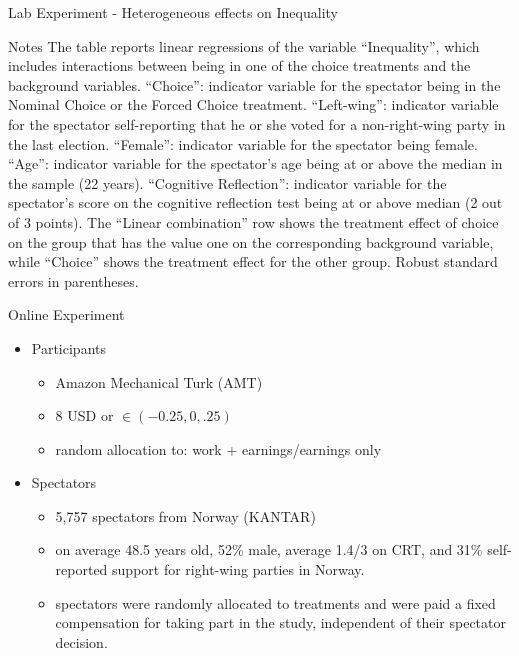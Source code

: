 \documentclass{beamer}
\begin{document}
	\begin{frame}{\tiny Lab Experiment - Heterogeneous effects on Inequality}

	\begin{block}{Notes}{\tiny
		The table reports linear regressions of the variable “Inequality”, which includes interactions
between being in one of the choice treatments and the background variables. “Choice”: indicator
variable for the spectator being in the Nominal Choice or the Forced Choice treatment. “Left-wing”:
indicator variable for the spectator self-reporting that he or she voted for a non-right-wing party in the
last election. “Female”: indicator variable for the spectator being female. “Age”: indicator variable
for the spectator’s age being at or above the median in the sample (22 years). “Cognitive Reflection”:
indicator variable for the spectator’s score on the cognitive reflection test being at or above median
(2 out of 3 points). The “Linear combination” row shows the treatment effect of choice on the group
that has the value one on the corresponding background variable, while “Choice” shows the treatment
effect for the other group. Robust standard errors in parentheses. %
}
		\end{block}
\end{frame}
\begin{frame}{Online Experiment}

	\begin{block}

		\begin{itemize}
			\item Participants
			\begin{itemize}
				\item Amazon Mechanical Turk (AMT)
				\item 8 USD or $\in (-0.25, 0, .25)$
				\item random allocation to: work + earnings/earnings only
			\end{itemize}
			\item Spectators
			\begin{itemize}
				\item 5,757 spectators from Norway (KANTAR)
				\item on average 48.5 years old, 52\% male, average 1.4/3 on CRT, and 31\% self-reported support for right-wing parties in Norway.
				\item spectators were randomly allocated to treatments and were paid a fixed compensation for taking part in the study, independent of their spectator decision.
			\end{itemize}
		\end{itemize}
	\end{block}
\end{frame}
\end{document}
